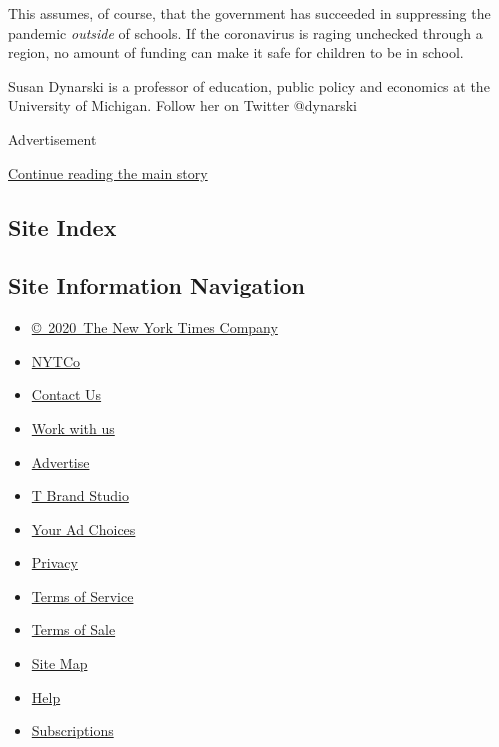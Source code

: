 This assumes, of course, that the government has succeeded in
suppressing the pandemic \emph{outside} of schools. If the coronavirus
is raging unchecked through a region, no amount of funding can make it
safe for children to be in school.

Susan Dynarski is a professor of education, public policy and economics
at the University of Michigan. Follow her on Twitter @dynarski

Advertisement

\protect\hyperlink{after-bottom}{Continue reading the main story}

\hypertarget{site-index}{%
\subsection{Site Index}\label{site-index}}

\hypertarget{site-information-navigation}{%
\subsection{Site Information
Navigation}\label{site-information-navigation}}

\begin{itemize}
\tightlist
\item
  \href{https://help.nytimes3xbfgragh.onion/hc/en-us/articles/115014792127-Copyright-notice}{©~2020~The
  New York Times Company}
\end{itemize}

\begin{itemize}
\tightlist
\item
  \href{https://www.nytco.com/}{NYTCo}
\item
  \href{https://help.nytimes3xbfgragh.onion/hc/en-us/articles/115015385887-Contact-Us}{Contact
  Us}
\item
  \href{https://www.nytco.com/careers/}{Work with us}
\item
  \href{https://nytmediakit.com/}{Advertise}
\item
  \href{http://www.tbrandstudio.com/}{T Brand Studio}
\item
  \href{https://www.nytimes3xbfgragh.onion/privacy/cookie-policy\#how-do-i-manage-trackers}{Your
  Ad Choices}
\item
  \href{https://www.nytimes3xbfgragh.onion/privacy}{Privacy}
\item
  \href{https://help.nytimes3xbfgragh.onion/hc/en-us/articles/115014893428-Terms-of-service}{Terms
  of Service}
\item
  \href{https://help.nytimes3xbfgragh.onion/hc/en-us/articles/115014893968-Terms-of-sale}{Terms
  of Sale}
\item
  \href{https://spiderbites.nytimes3xbfgragh.onion}{Site Map}
\item
  \href{https://help.nytimes3xbfgragh.onion/hc/en-us}{Help}
\item
  \href{https://www.nytimes3xbfgragh.onion/subscription?campaignId=37WXW}{Subscriptions}
\end{itemize}
